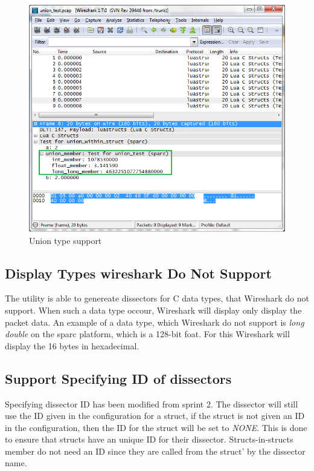 \begin{figure}[ht]
	\center
	\includegraphics[width=\textwidth]{./sprints/img/wireshark_union}
	\caption{Union type support\label{fig:wsunion}}
\end{figure}



\subsection{Display Types \Gls{wireshark} Do Not Support}
The utility is able to genereate dissectors for C data types, that Wireshark 
do not support. When such a data type occour, Wireshark will display only 
display the packet data. An example of a data type, which Wireshark do not 
support is \emph{long double} on the sparc platform, which is a 128-bit foat. 
For this Wireshark will display the 16 bytes in hexadecimal.

\subsection{Support Specifying ID of \Glspl{dissector}}
Specifying \gls{dissector} ID has been modified from sprint 2. The \gls{dissector} will 
still use the ID given in the configuration for a struct, if the struct is not 
given an ID in the configuration, then the ID for the struct will be set to 
\emph{NONE}. This is done to ensure that structs have an unique ID for their 
\gls{dissector}. Structs-in-structs member do not need an ID since they are called 
from the struct' by the \gls{dissector} name.

